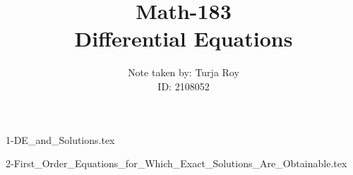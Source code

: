\documentclass[12pt]{article}
\title{
    \textbf{Math-183} \\
    \textbf{Differential Equations}
}
\author{
    Note taken by: Turja Roy \\
    ID: 2108052
}
\date{}
\numberwithin{equation}{subsection}
\begin{document}
\maketitle

\tableofcontents
\pagebreak


{1-DE_and_Solutions.tex}
\pagebreak

{2-First_Order_Equations_for_Which_Exact_Solutions_Are_Obtainable.tex}
\pagebreak
\end{document}
